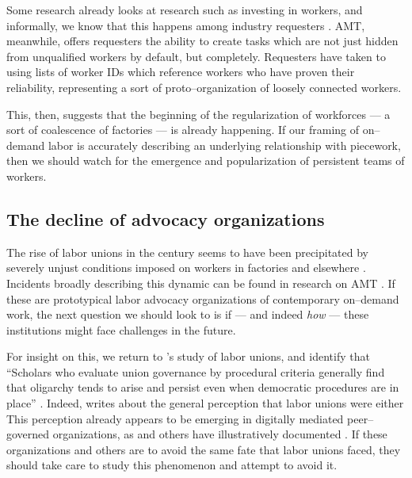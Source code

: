 \documentclass[chi_draft]{sigchi}
\begin{document}
Some research already looks at research such as investing in workers, and
informally, we know that this happens among industry requesters
\cite{jonBrelig,shepherdingDow}.
AMT, meanwhile, offers requesters the ability to create tasks which are
not just hidden from unqualified workers by default, but completely.
Requesters have taken to using lists of worker IDs which reference
workers who have proven their reliability,
representing a sort of proto--organization of loosely connected workers.

This, then, suggests that the beginning of the regularization of workforces
--- a sort of coalescence of factories ---
is already happening.
If our framing of on--demand labor is accurately describing an underlying relationship with piecework,
then we should watch for the emergence and popularization of persistent teams of workers.

\subsection{The decline of advocacy organizations}
The rise of labor unions in the  century seems to have been precipitated by
severely unjust conditions imposed on workers in factories and elsewhere
\cite{ebbinghaus1999institutions}.
Incidents broadly describing this dynamic can be found in research on AMT
\cite{turkopticon,dynamo}.
If these are prototypical labor advocacy organizations of contemporary on--demand work,
the next question we should look to is if
--- and indeed \textit{how} ---
these institutions might face challenges in the future.

For insight on this, we return to \citeyear{levi2009union}'s study of labor unions,
and identify that
``Scholars who evaluate union governance by procedural criteria generally find that oligarchy tends to arise and persist even when democratic procedures are in place''
\cite{levi2009union}.
Indeed, \citeauthor{levi2009union} writes about the general perception that labor unions were either
This perception already appears to be emerging in digitally mediated peer--governed organizations,
as \citeauthor{keegan2010egalitarians} and others have illustratively documented
\cite{beschastnikh2008wikipedian,keegan2010egalitarians}.
If these organizations and others are to avoid the same fate that labor unions faced,
they should take care to study this phenomenon and attempt to avoid it.
\end{document}

